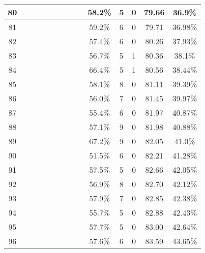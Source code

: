 \begin{longtable}{|c|c|c|c|c|c|c|c|c|c|c|c|c|c|}
80 &  \x    & \x    &       &       & \x    & \x    &       &       & 58.2\% &  5  & 0  & 79.66 & 36.9\% \\ \hline
81 &  \x    & \x    & \x    &       & \x    & \x    & \x\m  &       & 59.2\% &  6  & 0  & 79.71 & 36.98\% \\ \hline
82 &  \x    & \x    & \x    & \x    &       &       & \x    &       & 57.4\% &  6  & 0  & 80.26 & 37.93\% \\ \hline
83 &  \x    & \x    & \x    &       &       &       & \x    &       & 56.7\% &  5  & 1  & 80.36 & 38.1\% \\ \hline
84 &  \x    & \x    & \x    &       & \x\m  &       &       & \x    & 66.4\% &  5  & 1  & 80.56 & 38.44\% \\ \hline
85 &  \x    & \x    & \x    & \x    &       &       &       & \x    & 58.1\% &  8  & 0  & 81.11 & 39.39\% \\ \hline
86 &  \x    & \x    & \x    &       &       & \x    & \x    &       & 56.0\% &  7  & 0  & 81.45 & 39.97\% \\ \hline
87 &  \x    & \x    & \x    &       &       & \x\m  &       & \x\m  & 55.4\% &  6  & 0  & 81.97 & 40.87\% \\ \hline
88 &  \x    & \x    & \x    & \x    &       & \x\m  &       & \x\m  & 57.1\% &  9  & 0  & 81.98 & 40.88\% \\ \hline
89 &  \x    & \x    & \x    &       & \x\m  &       &       &       & 67.2\% &  9  & 0  & 82.05 & 41.0\% \\ \hline
90 &  \x    & \x    &       &       &       &       &       &       & 51.5\% &  6  & 0  & 82.21 & 41.28\% \\ \hline
91 &  \x    & \x    & \x    & \x    &       & \x    &       & \x    & 57.5\% &  5  & 0  & 82.66 & 42.05\% \\ \hline
92 &  \x    & \x    &       & \x    & \x    & \x    &       &       & 56.9\% &  8  & 0  & 82.70 & 42.12\% \\ \hline
93 &  \x    & \x    & \x    & \x    &       & \x\m  & \x\m  &       & 57.9\% &  7  & 0  & 82.85 & 42.38\% \\ \hline
94 &  \x    & \x    &       &       & \x    & \x    &       & \x    & 55.7\% &  5  & 0  & 82.88 & 42.43\% \\ \hline
95 &  \x    & \x    &       &       & \x    &       &       & \x    & 57.7\% &  5  & 0  & 83.00 & 42.64\% \\ \hline
96 &  \x    & \x    & \x    &       &       & \x    & \x\m  &       & 57.6\% &  6  & 0  & 83.59 & 43.65\% \\ \hline

\end{longtable}
